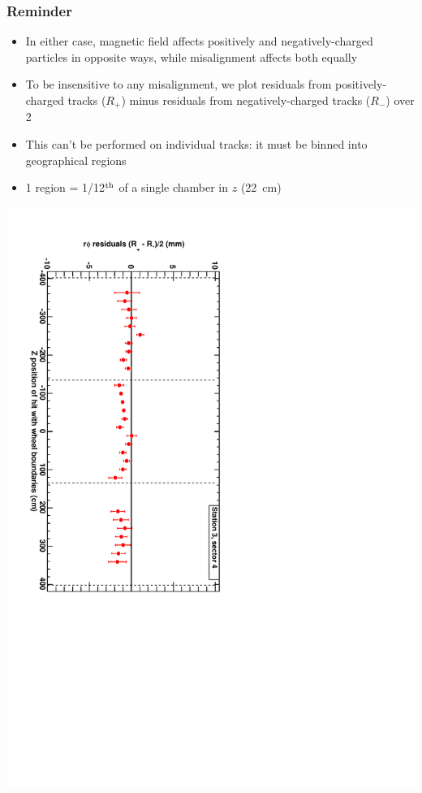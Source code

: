 \documentclass[compress]{beamer}
\begin{document}
\begin{frame}
\frametitle{Reminder}

\begin{itemize}
\item In either case, magnetic field affects positively and
  negatively-charged particles in opposite ways, while misalignment
  affects both equally
\item To be insensitive to any misalignment, we plot residuals from
  positively-charged tracks ($R_+$) minus residuals from
  negatively-charged tracks ($R_-$) over 2
\item This can't be performed on individual tracks: it must be binned into geographical regions
\item 1 region = 1/12$^{\mbox{\scriptsize th}}$ of a single chamber in $z$ (22~cm)
\end{itemize}

\begin{center}
\includegraphics[height=0.75\linewidth, angle=90]{map40GeV_3_4.pdf}
\end{center}
\end{frame}
\end{document}
